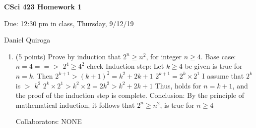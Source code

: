 \documentclass[11pt]{article}
\begin{document}
\begin{LARGE}
\centerline {\bf CSci 423 Homework 1}
\end{LARGE}
\vskip 0.25cm

\centerline{Due: 12:30 pm in class, Thursday, 9/12/19}
\centerline{Daniel Quiroga}

\begin{enumerate}

\item (5 points) Prove by induction that $2^n\ge n^2$, for integer $n\ge 4$.\newline 
Base case: $n = 4 ==>$ $2^{4} \geq 4^{2}$ check \newline
Induction step: Let $k \geq 4$ be given is true for $n = k$. Then \newline 
$2^{k+1} > (k+1)^{2} = k^2 + 2k + 1$ \newline 
$2^{k+1} = 2^k \times 2^1$ I assume that $2^k$ is $>$ $k^2$ \newline
$2^k \times 2^1 > k^2 \times 2 = 2k^2 > k^2 + 2k + 1$\newline 
Thus, holds for $n = k + 1$, and the proof of the induction step is complete. \newline 
Conclusion: By the principle of mathematical induction, it follows that $2^n\ge n^2$, is true for $n\ge 4$

Collaborators: NONE


\end{enumerate}
\end{document}
